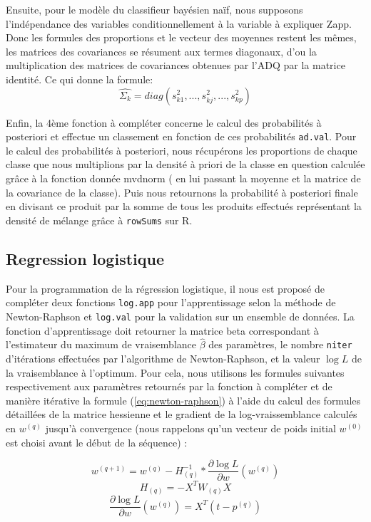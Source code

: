 \documentclass[10pt]{article}
\begin{document}
	Ensuite, pour le modèle du classifieur bayésien naïf, nous supposons l'indépendance des variables conditionnellement à la variable à expliquer Zapp. Donc les formules des proportions et le vecteur des moyennes restent les mêmes, les matrices des covariances se résument aux termes diagonaux, d'ou la multiplication des matrices de covariances obtenues par l'ADQ par la matrice identité. Ce qui donne la formule:  
	 \begin{equation*}
	 \widehat{\Sigma_{k}} = diag(s_{k1}^{2}, ... ,s_{kj}^{2}, ..., s_{kp}^{2} )
	 \end{equation*}
	 
	 Enfin, la 4ème fonction à compléter concerne le calcul des probabilités à posteriori et effectue un classement en fonction de ces probabilités \texttt{ad.val}. Pour le calcul des probabilités à posteriori, nous récupérons les proportions de chaque classe que nous multiplions par la densité à priori de la classe en question calculée grâce à la fonction donnée mvdnorm ( en lui passant la moyenne et la matrice de la covariance de la classe). Puis nous retournons la probabilité à posteriori finale en divisant ce produit par la somme de tous les produits effectués représentant la densité de mélange grâce à \texttt{rowSums} sur R. 
	 
	\subsection{Regression logistique}
	
	Pour la programmation de la régression logistique, il nous est proposé de compléter deux fonctions \texttt{log.app} pour l'apprentissage selon la méthode de Newton-Raphson et \texttt{log.val} pour la validation sur un ensemble de données. La fonction d'apprentissage doit retourner la matrice beta correspondant à l'estimateur du maximum de vraisemblance $\widehat{\beta}$ des paramètres, le nombre \texttt{niter} d'itérations effectuées par l'algorithme de Newton-Raphson, et la valeur $\log L$ de la vraisemblance à l'optimum.
	Pour cela, nous utilisons les formules suivantes respectivement aux paramètres retournés par la fonction à compléter et de manière itérative la formule (\ref{eq:newton-raphson}) à l'aide du calcul des formules détaillées de la matrice hessienne et le gradient de la log-vraissemblance calculés en $w^{(q)}$  jusqu'à convergence (nous rappelons qu'un vecteur de poids initial $w^{(0)}$ est choisi avant le début de la séquence) : 
	
	\begin{equation} \label{eq:newton-raphson}
	w^{(q+1)} = w^{(q)}-H^{-1}_{(q)}*\dfrac{\partial \log L}{\partial w}(w^{(q)})
	\end{equation}
	\begin{equation*}
	H_{(q)} = -X^{T}W_{(q)}X
	\end{equation*}
	\begin{equation*}
	\dfrac{\partial \log L}{\partial w}(w^{(q)}) = X^{T}(t-p^{(q)})
	\end{equation*}
	
\end{document}

